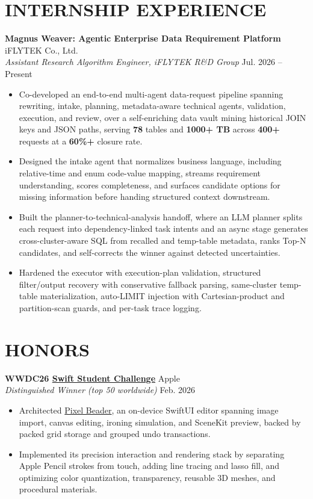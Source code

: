 \documentclass[10pt, a4paper]{article}
\newcommand{\entry}[4]{
  \vspace{0.2em}
  {\large\textbf{\color{PrimaryText}#1}} \hfill {\color{MutedText}#3} \\
  \textit{\color{PrimaryText}#2} \hfill {\small\color{MutedText}#4} \par
}
\begin{document}
\section*{INTERNSHIP EXPERIENCE}
\entry{Magnus Weaver: Agentic Enterprise Data Requirement Platform}{Assistant Research Algorithm Engineer, iFLYTEK R\&D Group}{iFLYTEK Co., Ltd.}{Jul. 2026 -- Present}
\begin{itemize}
    \item Co-developed an end-to-end multi-agent data-request pipeline spanning rewriting, intake, planning, metadata-aware technical agents, validation, execution, and review, over a self-enriching data vault mining historical JOIN keys and JSON paths, serving \textbf{78} tables and \textbf{1000+ TB} across \textbf{400+} requests at a \textbf{60\%+} closure rate.
    \item Designed the intake agent that normalizes business language, including relative-time and enum code-value mapping, streams requirement understanding, scores completeness, and surfaces candidate options for missing information before handing structured context downstream.
    \item Built the planner-to-technical-analysis handoff, where an LLM planner splits each request into dependency-linked task intents and an async stage generates cross-cluster-aware SQL from recalled and temp-table metadata, ranks Top-N candidates, and self-corrects the winner against detected uncertainties.
    \item Hardened the executor with execution-plan validation, structured filter/output recovery with conservative fallback parsing, same-cluster temp-table materialization, auto-LIMIT injection with Cartesian-product and partition-scan guards, and per-task trace logging.
\end{itemize}

\vspace{0.3em}
\section*{HONORS}
\entry{WWDC26 \href{https://developer.apple.com/swift-student-challenge/}{Swift Student Challenge}}{Distinguished Winner (top 50 worldwide)}{Apple}{Feb. 2026}
\begin{itemize}
    \item Architected \href{https://apps.apple.com/us/app/pixel-beader/id6780332489}{Pixel Beader}, an on-device SwiftUI editor spanning image import, canvas editing, ironing simulation, and SceneKit preview, backed by packed grid storage and grouped undo transactions.
    \item Implemented its precision interaction and rendering stack by separating Apple Pencil strokes from touch, adding line tracing and lasso fill, and optimizing color quantization, transparency, reusable 3D meshes, and procedural materials.
\end{itemize}
\end{document}
